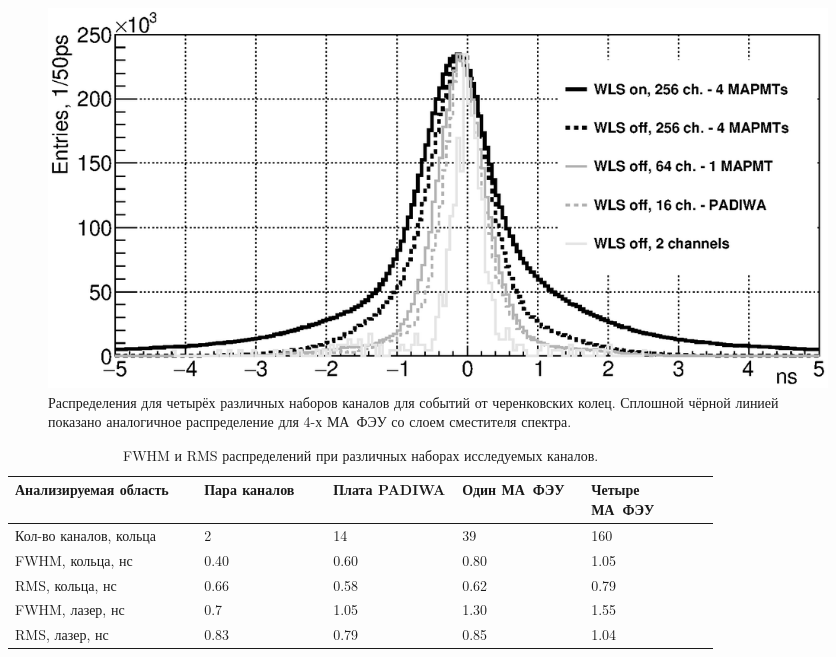 \begin{figure}[H]
\centering
\includegraphics[width=1.0\textwidth]{pictures/Time_precision_evolution_rings_5_bw_17Mar2017.eps}
\caption{Распределения для четырёх различных наборов каналов для событий от черенковских колец. Сплошной чёрной линией показано аналогичное распределение для 4-х МА~ФЭУ со слоем сместителя спектра.}
\label{fig:TimeResEvolutionRings}
\end{figure}



\begin{table}[H]
\caption{FWHM и RMS распределений при различных наборах исследуемых каналов.}
\label{tabl:EvolutionParams}
\begin{tabular}{ | p{0.22\linewidth} | p{0.15\linewidth} | p{0.15\linewidth} | p{0.15\linewidth} | p{0.15\linewidth} | }
	\hline
	\scriptsize{Анализируемая область} & \scriptsize{Пара каналов} & \scriptsize{Плата PADIWA} & \scriptsize{Один МА~ФЭУ} & \scriptsize{Четыре МА~ФЭУ} \\
	\hline \hline
	\scriptsize{Кол-во каналов, кольца} & 2 & 14 & 39 & 160 \\
	\hline
	\scriptsize{FWHM, кольца, нс} & 0.40 & 0.60 & 0.80 & 1.05 \\
	\hline
	\scriptsize{RMS, кольца, нс} & 0.66 & 0.58 & 0.62 & 0.79 \\
	\hline \hline
	\scriptsize{FWHM, лазер, нс} & 0.7 & 1.05 & 1.30 & 1.55 \\
	\hline
	\scriptsize{RMS, лазер, нс} & 0.83 & 0.79 & 0.85 & 1.04 \\
	\hline
\end{tabular}
\end{table}
